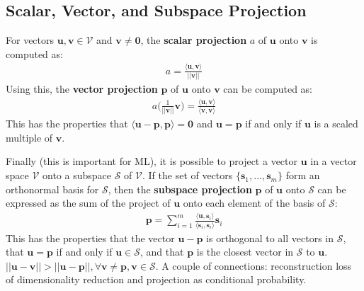 \documentclass{harvardml}
\theoremstyle{definition}
\theoremstyle{plain}
\renewcommand{\v}[1]{\mathbf{#1}}
\begin{document}
    \subsection{Scalar, Vector, and Subspace Projection}
        For vectors $\v u, \v v \in \mathcal{V}$ and $\v v \neq \v 0$, the 
        \textbf{scalar projection} $a$ of $\v u$ onto $\v v$ is computed as:
            \begin{align*}
                a = \frac{\langle \v u, \v v \rangle}{||\v v||}
            \end{align*}
        \noindent Using this, the \textbf{vector projection} 
		$\v p$ of $\v u$ onto $\v v$ can be computed as:
            \begin{align*}
                a\big(\frac{1}{||\v v||}\v v\big) = 
                \frac{\langle \v u, \v v \rangle}
				{\langle \v v, \v v \rangle}
            \end{align*}
        \noindent This has the properties that $\langle \v u - \v p,
		\v p \rangle = \v 0$ and $\v u = \v p$ if and only if $\v u$ 
		is a scaled multiple of $\v v$.

        \noindent Finally (this is important for ML), it is possible
        to project a vector $\v u$ in a vector space $\mathcal{V}$ onto a
        subspace  $\mathcal{S}$ of $\mathcal{V}$. If the set of vectors
        $\{\v s_1,...,\v s_m\}$ form an orthonormal basis for $\mathcal{S}$,
        then the \textbf{subspace projection} $\v p$ of $\v u$ onto 
		$\mathcal{S}$ can be expressed as the sum of the project of 
		$\v u$ onto each element of the basis of $\mathcal{S}$:
            \begin{align*}
                \v p = \sum_{i=1}^m 
				\frac{\langle \v u, \v s_i \rangle}
                {\langle \v s_i, \v s_i \rangle} \v s_i
            \end{align*}
        \noindent This has the properties that the vector 
		$\v u - \v p$ is orthogonal to all vectors in $\mathcal{S}$, 
		that $\v u = \v p$ if and only if $\v u \in \mathcal{S}$, and 
		that $\v p$ is the closest vector in $\mathcal{S}$ to $\v u$.
        $|| \v u - \v v || > || \v u - \v p ||, \forall \v v \neq \v p, 
		\v v \in \mathcal{S}$. A couple of connections: reconstruction 
		loss of dimensionality reduction and projection as conditional 
		probability.
\end{document}
